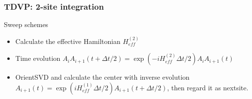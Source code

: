 \documentclass{beamer}
\begin{document}
\begin{frame}
	\frametitle{TDVP: 2-site integration}
	Sweep schemes
	\begin{itemize}
		\item Calculate the effective Hamiltonian $H_{eff}^{(2)}$
		\item Time evolution $A_iA_{i+1}(t+\Delta t/2) = \exp(-iH_{eff}^{(2)}\Delta t / 2)A_iA_{i+1}(t)$ 
		\item OrientSVD and calculate the center with inverse evolution $A_{i+1}(t) = \exp(iH_{eff}^{(1)}\Delta t /2) A_{i+1}(t+\Delta t/2)$, then regard it as nextsite.
		\begin{figure}[H]
			\centering
			\subfigbottomskip=2pt
			\subfigcapskip=-5pt
		\end{figure}
	\end{itemize}
\end{frame}
\end{document}
